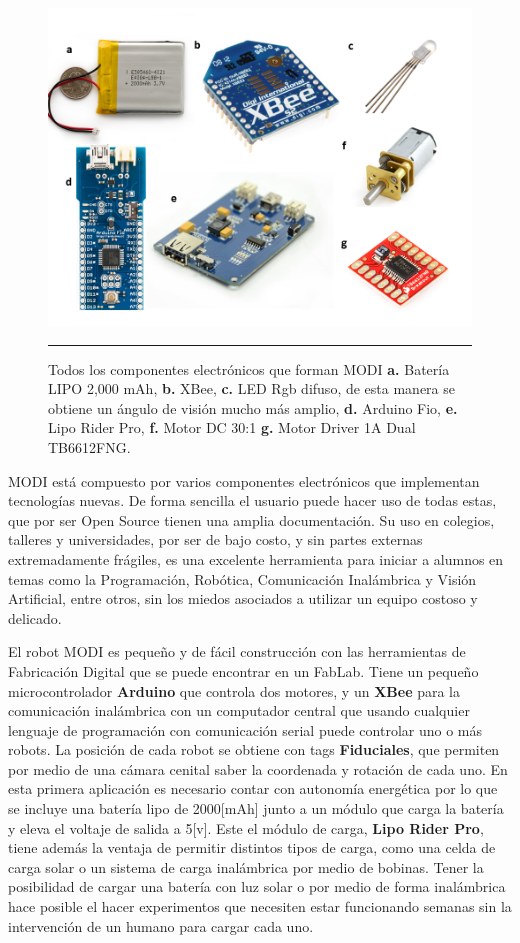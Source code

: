 \begin{figure}[htbp]
	\centering
		\includegraphics[width=\textwidth]{./Figures/MODI/compElo.png}
		\rule{35em}{0.5pt}
	\caption[Componentes Electrónicos]{Todos los componentes electrónicos que forman MODI \textbf{ a.} Batería LIPO 2,000 mAh, \textbf{b.} XBee, \textbf{c.} LED Rgb difuso, de esta manera se obtiene un ángulo de visión mucho más amplio, \textbf{d.} Arduino Fio, \textbf{e.} Lipo Rider Pro,\textbf{ f.} Motor DC 30:1 \textbf{g.} Motor Driver 1A Dual TB6612FNG.}
	\label{fig:compELO}
\end{figure}

MODI está compuesto por varios componentes electrónicos que implementan tecnologías nuevas. De forma sencilla el usuario puede hacer uso de todas estas, que por ser Open Source tienen una amplia documentación. Su uso en colegios, talleres y universidades, por ser de bajo costo, y sin partes externas extremadamente frágiles, es una excelente herramienta para iniciar a alumnos en temas como la Programación, Robótica, Comunicación Inalámbrica y Visión Artificial, entre otros, sin los miedos asociados a utilizar un equipo costoso y delicado.

El robot MODI es pequeño y de fácil construcción con las herramientas de Fabricación Digital que se puede encontrar en un FabLab. Tiene un pequeño microcontrolador \textbf{Arduino} que controla dos motores, y un \textbf{XBee} para la comunicación inalámbrica con un computador central que usando cualquier lenguaje de programación con comunicación serial puede controlar uno o más robots. La posición de cada robot se obtiene con tags \textbf{Fiduciales}, que permiten por medio de una cámara cenital saber la coordenada y rotación de cada uno. En esta primera aplicación es necesario contar con autonomía energética por lo que se incluye una batería lipo de 2000[mAh] junto a un módulo que carga la batería y eleva el voltaje de salida a 5[v]. Este el módulo de carga, \textbf{Lipo Rider Pro}, tiene además la ventaja de permitir distintos tipos de carga, como una celda de carga solar o un sistema de carga inalámbrica por medio de bobinas. Tener la posibilidad de cargar una batería con luz solar o por medio de forma inalámbrica hace posible el hacer experimentos que necesiten estar funcionando semanas sin la intervención de un humano para cargar cada uno.

